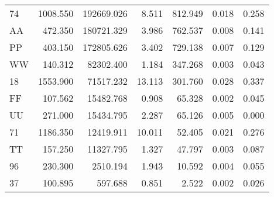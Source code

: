 \begin{tabular}{lrrrrrr}
          74 &        1008.550 &       192669.026 &       8.511 &              812.949 &        0.018 &                 0.258 \\
          AA &         472.350 &       180721.329 &       3.986 &              762.537 &        0.008 &                 0.141 \\
          PP &         403.150 &       172805.626 &       3.402 &              729.138 &        0.007 &                 0.129 \\
          WW &         140.312 &        82302.400 &       1.184 &              347.268 &        0.003 &                 0.043 \\
          18 &        1553.900 &        71517.232 &      13.113 &              301.760 &        0.028 &                 0.337 \\
          FF &         107.562 &        15482.768 &       0.908 &               65.328 &        0.002 &                 0.045 \\
          UU &         271.000 &        15434.795 &       2.287 &               65.126 &        0.005 &                 0.000 \\
          71 &        1186.350 &        12419.911 &      10.011 &               52.405 &        0.021 &                 0.276 \\
          TT &         157.250 &        11327.795 &       1.327 &               47.797 &        0.003 &                 0.087 \\
          96 &         230.300 &         2510.194 &       1.943 &               10.592 &        0.004 &                 0.055 \\
          37 &         100.895 &          597.688 &       0.851 &                2.522 &        0.002 &                 0.026 \\
\bottomrule
\end{tabular}
